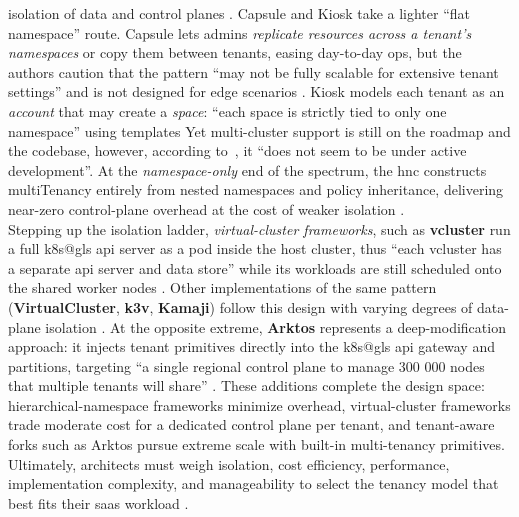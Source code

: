 \documentclass[11pt, a4paper, oneside, listof=totoc]{scrartcl}
\begin{document}
            isolation of data and control planes \parencite[p.~651]{nguyen2022}.
            Capsule and Kiosk take a lighter \enquote{flat namespace} route.  
            Capsule lets admins \textit{replicate resources across a tenant's namespaces} or copy
            them between tenants, easing day-to-day ops, but the authors caution that the pattern
            \enquote{may not be fully scalable for extensive tenant settings} and is not designed
            for edge scenarios \parencite[p.~144581]{senel2023}.
            Kiosk models each tenant as an \textit{account} that may create a \textit{space}:
            \enquote{each space is strictly tied to only one namespace} using templates
            \parencite[p.~144581]{senel2023}
            Yet multi-cluster support is still on the roadmap and the codebase, however, according
            to~\cite{senel2023}, it \enquote{does not seem to be under active development}.
            At the \textit{namespace-only} end of the spectrum, the \gls{hnc} constructs
            \gls{multiTenancy} entirely from nested namespaces and policy inheritance, delivering
            near-zero control-plane overhead at the cost of weaker isolation
            \parencite[p.~144581]{senel2023}.
            \\
            Stepping up the isolation ladder, \textit{virtual-cluster frameworks}, such as
            \textbf{vcluster} run a full \gls{k8s@gls} \gls{api} server as a pod inside the host
            cluster, thus \enquote{each vcluster has a separate \gls{api} server and data store}
            while its workloads are still scheduled onto the shared worker nodes
            \parencite[pp.~144580--144581]{senel2023}.
            Other implementations of the same pattern (\textbf{VirtualCluster}, \textbf{k3v},
            \textbf{Kamaji}) follow this design with varying degrees of data-plane isolation
            \parencite[pp.~144580--144581]{senel2023}.
            At the opposite extreme, \textbf{Arktos} represents a deep-modification approach: it
            injects tenant primitives directly into the \gls{k8s@gls} \gls{api} gateway and
            partitions, targeting \enquote{a single regional control plane to manage 300 000 nodes
            that multiple tenants will share} \parencite[p.~144582]{senel2023}.
            These additions complete the design space: hierarchical-namespace frameworks minimize
            overhead, virtual-cluster frameworks trade moderate cost for a dedicated control plane
            per tenant, and tenant-aware forks such as Arktos pursue extreme scale with built-in
            multi-tenancy primitives.
            \\
            Ultimately, architects must weigh isolation, cost efficiency, performance,
            implementation complexity, and manageability to select the tenancy model that best fits
            their \gls{saas} workload \parencite[p.~137]{azureWhitepaper}.
\end{document}

